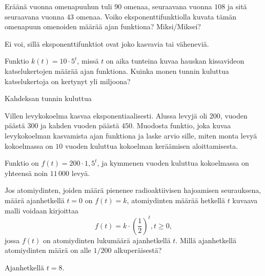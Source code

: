 \begin{tehtavasivu}
\begin{tehtava}
Eräänä vuonna omenapuuhun tuli $90$ omenaa, seuraavana vuonna $108$ ja sitä seuraavana vuonna $43$ omenaa. Voiko eksponenttifunktiolla kuvata tämän omenapuun omenoiden määrää ajan funktiona? Miksi/Miksei?
\begin{vastaus}
Ei voi, sillä eksponenttifunktiot ovat joko kasvavia tai väheneviä.
\end{vastaus}
\end{tehtava}

\begin{tehtava}
Funktio $k(t) = 10 \cdot 5^t$, missä $t$ on aika tunteina kuvaa hauskan kissavideon katselukertojen määrää ajan funktiona. Kuinka monen tunnin kuluttua katselukertoja on kertynyt yli miljoona?
\begin{vastaus}
Kahdeksan tunnin kuluttua
\end{vastaus}
\end{tehtava}

\begin{tehtava}
Villen levykokoelma kasvaa eksponentiaalisesti. Alussa levyjä oli $200$, vuoden päästä $300$ ja kahden vuoden päästä $450$. Muodosta funktio, joka kuvaa levykokoelman kasvamista ajan funktiona ja laske arvio sille, miten monta levyä kokoelmassa on $10$ vuoden kuluttua kokoelman keräämisen aloittamisesta.
\begin{vastaus}
Funktio on $f(t) = 200 \cdot 1,5^t$, ja kymmenen vuoden kuluttua kokoelmassa on yhteensä noin $11\,000$ levyä.
\end{vastaus}
\end{tehtava}

\begin{tehtava} %
Jos atomiydinten, joiden määrä pienenee radioaktiivisen hajoamisen seurauksena, määrä ajanhetkellä $t=0$ on $f(t)=k$, atomiydinten määrää hetkellä $t$ kuvaava malli voidaan kirjoittaa \[f(t) = k \cdot \left( \frac{1}{2} \right)^t, t \ge 0,\] jossa $f(t)$ on atomiydinten lukumäärä ajanhetkellä $t$. Millä ajanhetkellä atomiydinten määrä on alle $1/200$ alkuperäisestä?
\begin{vastaus}
Ajanhetkellä $t = 8$.
\end{vastaus}
\end{tehtava}


\end{tehtavasivu}
